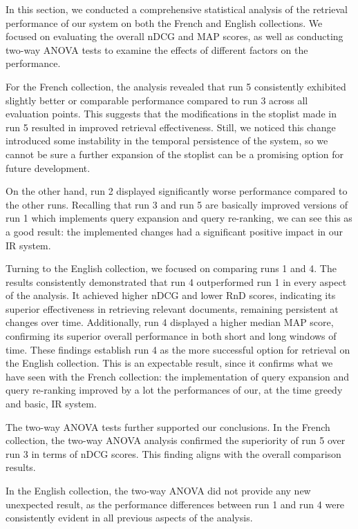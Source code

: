 In this section, we conducted a comprehensive statistical analysis of the retrieval performance of our system on both the French and English collections. 
We focused on evaluating the overall \ac{nDCG} and \ac{MAP} scores, as well as conducting two-way \ac{ANOVA} tests to examine the effects of different factors on the performance.

For the French collection, the analysis revealed that run 5 consistently exhibited slightly better or comparable performance compared to run 3 across all evaluation points. 
This suggests that the modifications in the stoplist made in run 5 resulted in improved retrieval effectiveness.
Still, we noticed this change introduced some instability in the temporal persistence of the system, so we cannot be sure a further expansion of the stoplist can be a promising option for future development. 

On the other hand, run 2 displayed significantly worse performance compared to the other runs. 
Recalling that run 3 and run 5 are basically improved versions of run 1 which implements query expansion and query re-ranking, we can see this as a good result: the implemented changes had a significant positive impact in our \ac{IR} system.  

Turning to the English collection, we focused on comparing runs 1 and 4. 
The results consistently demonstrated that run 4 outperformed run 1 in every aspect of the analysis. 
It achieved higher \ac{nDCG} and lower \ac{RnD} scores, indicating its superior effectiveness in retrieving relevant documents, remaining persistent at changes over time. 
Additionally, run 4 displayed a higher median \ac{MAP} score, confirming its superior overall performance in both short and long windows of time. 
These findings establish run 4 as the more successful option for retrieval on the English collection.
This is an expectable result, since it confirms what we have seen with the French collection: the implementation of query expansion and query re-ranking improved by a lot the performances of our, at the time greedy and basic, \ac{IR} system. 

The two-way \ac{ANOVA} tests further supported our conclusions. 
In the French collection, the two-way \ac{ANOVA} analysis confirmed the superiority of run 5 over run 3 in terms of \ac{nDCG} scores. 
This finding aligns with the overall comparison results. 

In the English collection, the two-way \ac{ANOVA} did not provide any new unexpected result, as the performance differences between run 1 and run 4 were consistently evident in all previous aspects of the analysis.


